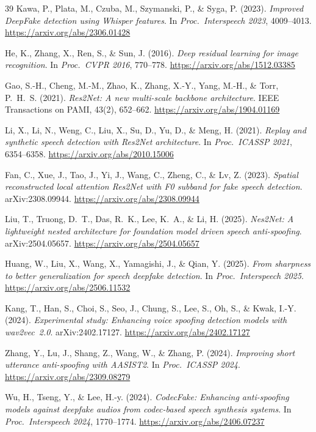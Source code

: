 \documentclass[11pt,a4paper]{article}
\begin{document}
\begin{thebibliography}{39}
Kawa, P., Plata, M., Czuba, M., Szymanski, P., \& Syga, P. (2023).
\textit{Improved DeepFake detection using Whisper features}.
In \textit{Proc.\ Interspeech 2023}, 4009--4013.
\url{https://arxiv.org/abs/2306.01428}

He, K., Zhang, X., Ren, S., \& Sun, J. (2016).
\textit{Deep residual learning for image recognition}.
In \textit{Proc.\ CVPR 2016}, 770--778.
\url{https://arxiv.org/abs/1512.03385}

Gao, S.-H., Cheng, M.-M., Zhao, K., Zhang, X.-Y., Yang, M.-H.,
\& Torr, P.~H.~S. (2021).
\textit{Res2Net: A new multi-scale backbone architecture}.
IEEE Transactions on PAMI, 43(2), 652--662.
\url{https://arxiv.org/abs/1904.01169}

Li, X., Li, N., Weng, C., Liu, X., Su, D., Yu, D., \& Meng, H. (2021).
\textit{Replay and synthetic speech detection with Res2Net architecture}.
In \textit{Proc.\ ICASSP 2021}, 6354--6358.
\url{https://arxiv.org/abs/2010.15006}

Fan, C., Xue, J., Tao, J., Yi, J., Wang, C., Zheng, C., \& Lv, Z. (2023).
\textit{Spatial reconstructed local attention Res2Net with F0 subband for fake
speech detection}. arXiv:2308.09944.
\url{https://arxiv.org/abs/2308.09944}

Liu, T., Truong, D.~T., Das, R.~K., Lee, K.~A., \& Li, H. (2025).
\textit{Nes2Net: A lightweight nested architecture for foundation model driven
speech anti-spoofing}. arXiv:2504.05657.
\url{https://arxiv.org/abs/2504.05657}

Huang, W., Liu, X., Wang, X., Yamagishi, J., \& Qian, Y. (2025).
\textit{From sharpness to better generalization for speech deepfake detection}.
In \textit{Proc.\ Interspeech 2025}.
\url{https://arxiv.org/abs/2506.11532}

Kang, T., Han, S., Choi, S., Seo, J., Chung, S., Lee, S., Oh, S.,
\& Kwak, I.-Y. (2024).
\textit{Experimental study: Enhancing voice spoofing detection models with wav2vec~2.0}.
arXiv:2402.17127.
\url{https://arxiv.org/abs/2402.17127}

Zhang, Y., Lu, J., Shang, Z., Wang, W., \& Zhang, P. (2024).
\textit{Improving short utterance anti-spoofing with AASIST2}.
In \textit{Proc.\ ICASSP 2024}.
\url{https://arxiv.org/abs/2309.08279}

Wu, H., Tseng, Y., \& Lee, H.-y. (2024).
\textit{CodecFake: Enhancing anti-spoofing models against deepfake audios from
codec-based speech synthesis systems}.
In \textit{Proc.\ Interspeech 2024}, 1770--1774.
\url{https://arxiv.org/abs/2406.07237}


\end{thebibliography}
\end{document}

